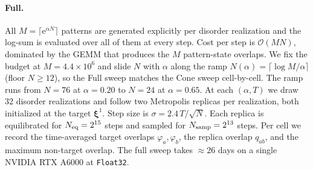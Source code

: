 \documentclass[letterpaper]{article} %
\newcommand{\bxi}{\boldsymbol{\xi}}
\newcommand{\e}{{\mathrm{e}}}
\begin{document}
\paragraph{Full.}
All $M = \lceil\e^{\alpha N}\rceil$ patterns are generated explicitly per
disorder realization and the log-sum is evaluated over all of them at
every step.  Cost per step is $\mathcal{O}(M N)$, dominated by the GEMM
that produces the $M$ pattern-state overlaps.  We fix the budget at
$M = 4.4 \times 10^6$ and slide $N$ with $\alpha$ along the ramp
$N(\alpha) = \lceil \log M / \alpha \rceil$ (floor $N \geq 12$), so the
Full sweep matches the Cone sweep cell-by-cell.  The ramp runs from
$N = 76$ at $\alpha = 0.20$ to $N = 24$ at $\alpha = 0.65$.  At each
$(\alpha, T)$ we draw 32 disorder realizations and follow two Metropolis
replicas per realization, both initialized at the target $\bxi^1$.  Step
size is $\sigma = 2.4\, T / \sqrt N$.  Each replica is equilibrated for
$N_{\rm eq} = 2^{15}$ steps and sampled for $N_{\rm samp} = 2^{13}$
steps.  Per cell we record the time-averaged target overlaps
$\varphi_a, \varphi_b$, the replica overlap $q_{ab}$, and the maximum
non-target overlap.  The full sweep takes $\approx 26$ days on a single
NVIDIA RTX A6000 at \texttt{Float32}.
\end{document}
